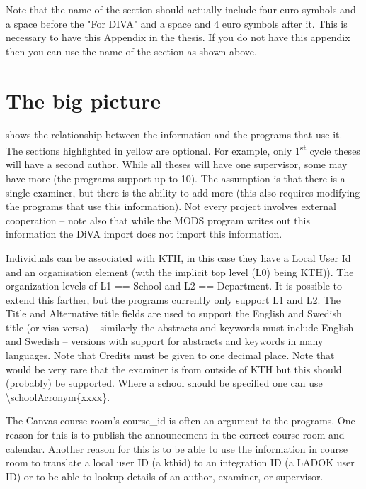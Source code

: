 Note that the name of the section should actually include four euro symbols and a space before the "For DIVA" and a space and 4 euro symbols after it. This is necessary to have this Appendix in the thesis. If you do not have this appendix then you can use the name of the section as shown above.
\clearpage

\section{The big picture}

 shows the relationship between the information and the programs that use it. The sections highlighted in yellow are optional. For example, only 1\textsuperscript{st} cycle theses will have a second author. While all theses will have one supervisor, some may have more (the programs support up to 10). The assumption is that there is a single examiner, but there is the ability to add more (this also requires modifying the programs that use this information). Not every project involves external cooperation – note also that while the MODS program writes out this information the DiVA import does not import this information.

Individuals can be associated with KTH, in this case they have a Local User Id and an organisation element (with the implicit top level (L0) being KTH)). The organization levels of L1 == School and L2 == Department. It is possible to extend this farther, but the programs currently only support L1 and L2. The Title and Alternative title fields are used to support the English and Swedish title (or visa versa) – similarly the abstracts and keywords must include English and Swedish – versions with support for abstracts and keywords in many languages. Note that Credits must be given to one decimal place.
Note that would be very rare that the examiner is from outside of KTH but this should (probably) be supported. Where a school should be specified one can use \textbackslash schoolAcronym\{xxxx\}.

The Canvas course room’s course\_id is often an argument to the programs. One reason for this is to publish the announcement in the correct course room and calendar. Another reason for this is to be able to use the information in course room to translate a local user ID (\ie a kthid) to an integration ID (\ie a LADOK user ID) or to be able to lookup details of an author, examiner, or supervisor.



